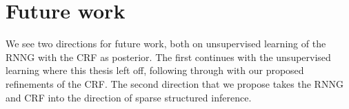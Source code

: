 
\section{Future work}
  We see two directions for future work, both on unsupervised learning of the RNNG with the CRF as posterior. The first continues with the unsupervised learning where this thesis left off, following through with our proposed refinements of the CRF. The second direction that we propose takes the RNNG and CRF into the direction of sparse structured inference.

